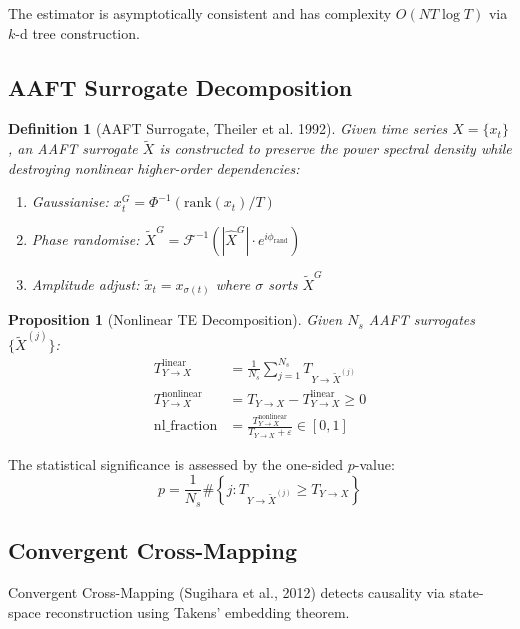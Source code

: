 \documentclass[11pt]{article}
\newtheorem{definition}{Definition}
\newtheorem{proposition}{Proposition}
\begin{document}
The estimator is asymptotically consistent and has complexity $O(NT \log T)$ via $k$-d tree construction.

\subsection{AAFT Surrogate Decomposition}

\begin{definition}[AAFT Surrogate, Theiler et al. 1992]
Given time series $X = \{x_t\}$, an AAFT surrogate $\tilde{X}$ is constructed to preserve the power spectral density while destroying nonlinear higher-order dependencies:
\begin{enumerate}
\item Gaussianise: $x_t^G = \Phi^{-1}(\text{rank}(x_t)/T)$
\item Phase randomise: $\tilde{X}^G = \mathcal{F}^{-1}\left(|\hat{X}^G| \cdot e^{i\phi_{\text{rand}}}\right)$
\item Amplitude adjust: $\tilde{x}_t = x_{\sigma(t)}$ where $\sigma$ sorts $\tilde{X}^G$
\end{enumerate}
\end{definition}

\begin{proposition}[Nonlinear TE Decomposition]
Given $N_s$ AAFT surrogates $\{\tilde{X}^{(j)}\}$:
\begin{align}
T_{Y \to X}^{\text{linear}} &= \frac{1}{N_s} \sum_{j=1}^{N_s} T_{Y \to \tilde{X}^{(j)}} \label{eq:te-linear} \\
T_{Y \to X}^{\text{nonlinear}} &= T_{Y \to X} - T_{Y \to X}^{\text{linear}} \geq 0 \label{eq:te-nonlinear} \\
\text{nl\_fraction} &= \frac{T_{Y \to X}^{\text{nonlinear}}}{T_{Y \to X} + \varepsilon} \in [0,1] \label{eq:nl-fraction}
\end{align}
\end{proposition}

The statistical significance is assessed by the one-sided $p$-value:
\begin{equation}
p = \frac{1}{N_s} \#\left\{j : T_{Y \to \tilde{X}^{(j)}} \geq T_{Y \to X}\right\}
\label{eq:te-pvalue}
\end{equation}

\subsection{Convergent Cross-Mapping}

Convergent Cross-Mapping (Sugihara et al., 2012) detects causality via state-space reconstruction using Takens' embedding theorem.
\end{document}
